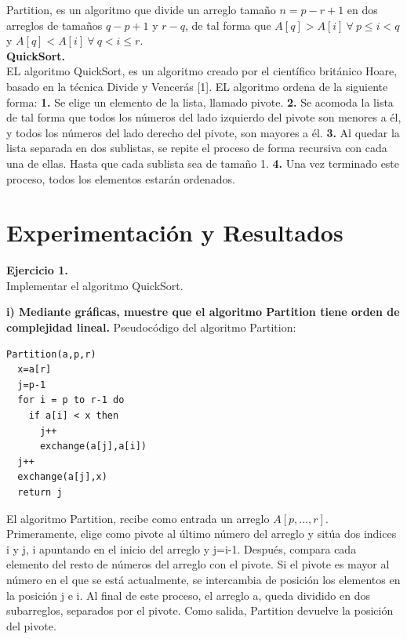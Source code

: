 \documentclass[12pt]{report}
\begin{document}
	Partition, es un algoritmo que divide un arreglo tamaño $n=p-r+1$ en dos arreglos de tamaños $q-p+1$ y $r-q$, de tal forma que $A[q]>A[i] \  \forall \ p \leq i <q$ y $A[q] < A[i] \ \forall \ q<i\leq r$.\\
	
	\textbf{QuickSort.}\\
	
	EL algoritmo QuickSort, es un algoritmo creado por el científico británico Hoare, basado en la técnica Divide y Vencerás [1]. EL algoritmo ordena de la siguiente forma:\newline \newline
	\textbf{1.} Se elige un elemento de la lista, llamado pivote.\newline
	\textbf{2.} Se acomoda la lista de tal forma que todos los números del lado izquierdo del pivote son menores a él, y todos los números del lado derecho del pivote, son mayores a él.\newline
	\textbf{3.} Al quedar la lista separada en dos sublistas, se repite el proceso de forma recursiva con cada una de ellas. Hasta que cada sublista sea de tamaño 1.\newline
	\textbf{4.} Una vez terminado este proceso, todos los elementos estarán ordenados.\\ 
	
		
	
	\section{Experimentación y Resultados}	
	\textbf{Ejercicio 1.}\\
	Implementar el algoritmo QuickSort.\newline
	
	\textbf{i) Mediante gráficas, muestre que el algoritmo Partition tiene orden de complejidad lineal.}\newline
	Pseudocódigo del algoritmo Partition:
	\lstset{language=C, breaklines=true, basicstyle=\footnotesize}
	\lstset{numbers=left, numberstyle=\tiny, stepnumber=1, numbersep=10pt}
	\begin{lstlisting}
Partition(a,p,r)
  x=a[r]
  j=p-1
  for i = p to r-1 do
    if a[i] < x then
      j++
      exchange(a[j],a[i])
  j++
  exchange(a[j],x)
  return j
	\end{lstlisting}
	
	El algoritmo Partition, recibe como entrada un arreglo $A[p,...,r]$. Primeramente, elige como pivote al último número del arreglo y sitúa dos indices i y j, i apuntando en el inicio del arreglo y j=i-1. Después, compara cada elemento del resto de números del arreglo con el pivote. Si el pivote es mayor al número en el que se está actualmente, se intercambia de posición los elementos en la posición j e i. Al final de este proceso, el arreglo a, queda dividido en dos subarreglos, separados por el pivote. Como salida, Partition devuelve la posición del pivote.\\
	
\end{document}
